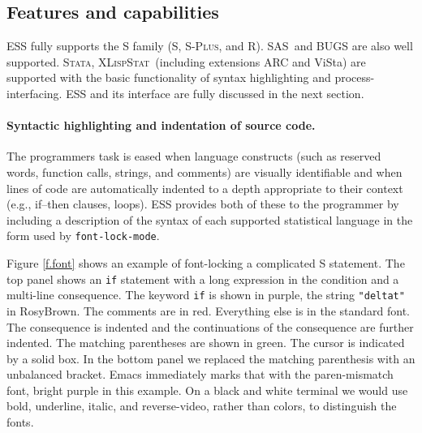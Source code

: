 \documentclass{article}
\newcommand*{\SAS}{\textsc{SAS}}
\newcommand*{\Splus}{\textsc{S-Plus}}
\newcommand*{\XLispStat}{\textsc{XLispStat}}
\newcommand*{\Stata}{\textsc{Stata}}
\newcommand{\stexttt}[1]{{\small\texttt{#1}}}
\begin{document}
\subsection{Features and capabilities}
\label{sec:ESS:features}

ESS fully supports the S family (S, \Splus, and R)\@.  \SAS\ and BUGS
are also well supported.  \Stata, \XLispStat\ (including extensions
ARC and ViSta) are supported with the basic functionality of syntax
highlighting and process-interfacing.  ESS and its interface are fully
discussed in the next section.

\paragraph{Syntactic highlighting and indentation of source code.}
The programmers task is eased when language constructs (such as
reserved words, function calls, strings, and comments) are visually
identifiable and when lines of code are automatically indented to a
depth appropriate to their context (e.g., if--then clauses, loops).
ESS provides both of these to the programmer by including a
description of the syntax of each supported statistical language in
the form used by \stexttt{font-lock-mode}.

Figure \ref{f.font} shows an example of font-locking a complicated S
statement.  The top panel shows an \stexttt{if} statement with a long
expression in the condition and a multi-line consequence.  The keyword
\stexttt{if} is shown in purple, the string \stexttt{"deltat"} in
RosyBrown.  The comments are in red.  Everything else is in the
standard font.  The consequence is indented and the continuations of
the consequence are further indented.  The matching parentheses are
shown in green.  The cursor is indicated by a solid box.  In the
bottom panel we replaced the matching parenthesis with an unbalanced
bracket.  Emacs immediately marks that with the paren-mismatch font,
bright purple in this example.  On a black and white terminal we would
use bold, underline, italic, and reverse-video, rather than colors, to
distinguish the fonts.

\end{document}
